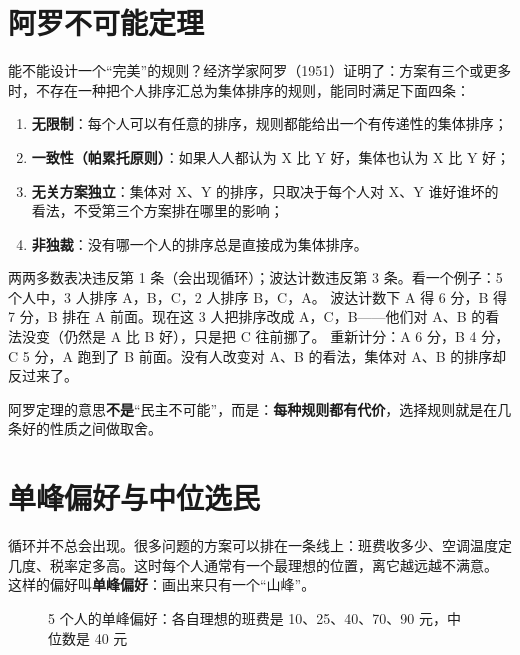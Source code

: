 \section{阿罗不可能定理}

能不能设计一个“完美”的规则？经济学家阿罗（1951）证明了：方案有三个或更多时，不存在一种把个人排序汇总为集体排序的规则，能同时满足下面四条：
\begin{enumerate}
  \item \textbf{无限制}：每个人可以有任意的排序，规则都能给出一个有传递性的集体排序；
  \item \textbf{一致性（帕累托原则）}：如果人人都认为 X 比 Y 好，集体也认为 X 比 Y 好；
  \item \textbf{无关方案独立}：集体对 X、Y 的排序，只取决于每个人对 X、Y 谁好谁坏的看法，不受第三个方案排在哪里的影响；
  \item \textbf{非独裁}：没有哪一个人的排序总是直接成为集体排序。
\end{enumerate}

两两多数表决违反第 1 条（会出现循环）；波达计数违反第 3 条。看一个例子：5 个人中，3 人排序 A，B，C，2 人排序 B，C，A。
波达计数下 A 得 6 分，B 得 7 分，B 排在 A 前面。现在这 3 人把排序改成 A，C，B——他们对 A、B 的看法没变（仍然是 A 比 B 好），只是把 C 往前挪了。
重新计分：A 6 分，B 4 分，C 5 分，A 跑到了 B 前面。没有人改变对 A、B 的看法，集体对 A、B 的排序却反过来了。

阿罗定理的意思\textbf{不是}“民主不可能”，而是：\textbf{每种规则都有代价}，选择规则就是在几条好的性质之间做取舍。

\section{单峰偏好与中位选民}

循环并不总会出现。很多问题的方案可以排在一条线上：班费收多少、空调温度定几度、税率定多高。这时每个人通常有一个最理想的位置，离它越远越不满意。
这样的偏好叫\textbf{单峰偏好}：画出来只有一个“山峰”。

\begin{figure}[!htbp]
\centering
{}
\caption{5 个人的单峰偏好：各自理想的班费是 10、25、40、70、90 元，中位数是 40 元}
\label{fig:es-single-peak}
\end{figure}

